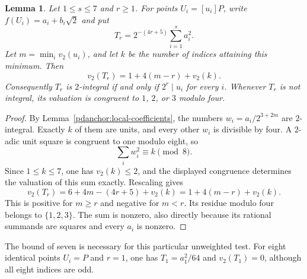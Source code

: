 \documentclass[11pt,a4paper]{article}
\newtheorem{lemma}[theorem]{Lemma}
\theoremstyle{definition}
\theoremstyle{remark}
\begin{document}
\begin{lemma}\label{pdanchor:seven-depths}
Let $1\le s\le7$ and $r\ge1$.  For points $U_i=[u_i]P$,
write $f(U_i)=a_i+b_i\sqrt2$ and put
\[
 T_r=2^{-(4r+5)}\sum_{i=1}^{s}a_i^2.
\]
Let $m=\min_i v_2(u_i)$, and let $k$ be the number of indices
attaining this minimum.  Then
\[
                 v_2(T_r)=1+4(m-r)+v_2(k).
\]
Consequently $T_r$ is $2$-integral if and only if
$2^r\mid u_i$ for every $i$.  Whenever $T_r$ is not integral,
its valuation is congruent to $1$, $2$, or $3$ modulo four.
\end{lemma}
\begin{proof}
By Lemma~\ref{pdanchor:local-coefficients}, the numbers
$w_i=a_i/2^{3+2m}$ are $2$-integral.  Exactly $k$ of them
are units, and every other $w_i$ is divisible by four.
A $2$-adic unit square is congruent to one modulo eight, so
\[
                   \sum_iw_i^2\equiv k\pmod8.
\]
Since $1\le k\le7$, one has $v_2(k)\le2$, and the displayed
congruence determines the valuation of this sum exactly.
Rescaling gives
\[
 v_2(T_r)=6+4m-(4r+5)+v_2(k)
         =1+4(m-r)+v_2(k).
\]
This is positive for $m\ge r$ and negative for $m<r$.
Its residue modulo four belongs to $\{1,2,3\}$.
The sum is nonzero, also directly because its rational summands
are squares and every $a_i$ is nonzero.
\end{proof}

The bound of seven is necessary for this particular unweighted
test.  For eight identical points $U_i=P$ and $r=1$, one has
$T_1=a_1^2/64$ and $v_2(T_1)=0$, although all eight indices
are odd.
\end{document}

